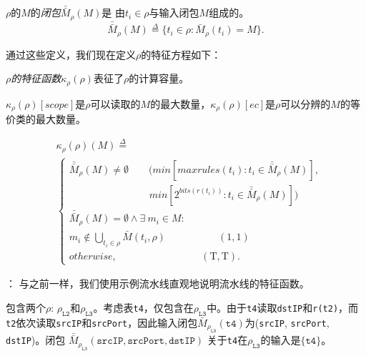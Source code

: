 \begin{definition} $\rho$的$M$的{\em 闭包$\bar{\bar{M}}_\rho(M)$}是 由$t_i \in \rho$与输入闭包$M$组成的。
\begin{equation*}
\bar{\bar{M}}_\rho(M) \overset{\Delta}{=} \{t_i \in \rho : \bar{M}_\rho(t_i) = M\}. 
\end{equation*}
\end{definition}

通过这些定义，我们现在定义$\rho$的特征方程如下：
\begin{definition} {\em $\rho$的特征函数$\kappa_\rho(\rho)$}表征了$\rho$的计算容量。

$\kappa_\rho(\rho)[scope]$是$\rho$可以读取的$M$的最大数量，$\kappa_\rho(\rho)[ec]$是$\rho$可以分辨的$M$的等价类的最大数量。

\begin{equation*}
\begin{split}
&\kappa_\rho(\rho)(M) \overset{\Delta}{=}\\
&\begin{cases}
\bar{\bar{M}}_\rho(M) \neq \emptyset \quad \quad (min[maxrules(t_i) : t_i \in \bar{\bar{M}}_\rho(M)],\\
\quad \quad \quad \quad \quad \quad \quad \quad  min[2^{bits(r(t_i))} : t_i \in \bar{\bar{M}}_\rho(M)])\\
\bar{\bar{M}}_\rho(M) = \emptyset \wedge \exists\ m_i \in M :\\
m_i \notin \bigcup_{t_i \in \rho} \bar{M}(t_i, \rho)\  \quad \quad \quad \quad \quad (1, 1)\\
otherwise, \quad \quad \quad \quad \quad \quad \quad \ \ \ \ \, \, \,  (\mathrm{T}, \mathrm{T}). %
\end{cases}
\end{split}
\end{equation*}
\end{definition}

： 与之前一样，我们使用示例流水线\exampledp 直观地说明流水线的特征函数。

\exampledp{}包含两个$\rho$: $\rho_{\texttt{L2}}$和$\rho_{\texttt{L3}}$。考虑表\texttt{t4}，仅包含在$\rho_{\texttt{L3}}$中。由于\texttt{t4}读取\texttt{dstIP}和\texttt{r(t2)}，而\texttt{t2}依次读取\texttt{srcIP}和\texttt{srcPort}，因此输入闭包$\bar{M}_{\rho_{\texttt{L3}}}(\texttt{t4})$为(\texttt{srcIP}, \texttt{srcPort}, \texttt{dstIP})。闭包 $\bar{\bar{M}}_{\rho_\texttt{L3}}(\texttt{srcIP}, \texttt{srcPort}, \texttt{dstIP})$ 关于\texttt{t4}在$\rho_{\texttt{L3}}$的输入是$\{\texttt{t4}\}$。


